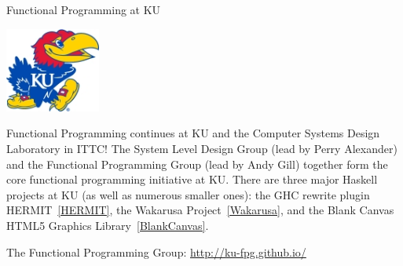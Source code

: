 \begin{hcarentry}[section]{Functional Programming at KU}
\label{ukansas}
\makeheader

\begin{center}
\includegraphics[width=0.235\textwidth]{html/jh2.jpg}
\end{center}

Functional Programming continues at KU and
the Computer Systems Design Laboratory in ITTC!
The System Level Design Group (lead by Perry Alexander)
and the Functional Programming Group (lead by Andy Gill)
together form the core functional programming initiative at KU.
There are three major Haskell projects at KU (as
well as numerous smaller ones):
the GHC rewrite plugin HERMIT~\cref{HERMIT},
the Wakarusa Project~\cref{Wakarusa},
and the Blank Canvas HTML5 Graphics Library~\cref{BlankCanvas}.

\FurtherReading
\begin{compactitem}
\item   The Functional Programming Group:
    \url{http://ku-fpg.github.io/}
\end{compactitem}
\end{hcarentry}

